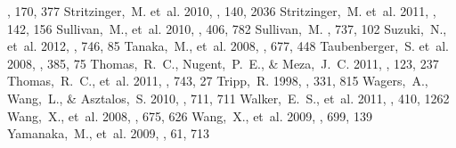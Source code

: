 \documentclass[apj]{emulateapj-rtx4}
\begin{document}
\begin{thebibliography}{}
  \apjs, 170, 377 
  Stritzinger,~M. et~al. 2010, \aj, 140, 2036
  Stritzinger,~M. et~al. 2011, \aj, 142, 156
 Sullivan,~M., et~al. 2010,
  \mnras, 406, 782 
 Sullivan,~M. \apj, 737,
  102
 Suzuki,~N., et~al. 2012, \apj,
  746, 85
 Tanaka,~M., et~al. 2008, \apj,
  677, 448 
  Taubenberger,~S. et~al. 2008, \mnras, 385, 75
 Thomas,~R.~C.,
  Nugent,~P.~E., \& Meza,~J.~C. 2011, \pasp, 123, 237
 Thomas,~R.~C., et~al. 2011,
  \apj, 743, 27
 Tripp,~R. 1998, \aap, 331, 815
 Wagers,~A., Wang,~L., \&
  Asztalos,~S. 2010, \apj, 711, 711
 Walker,~E.~S., et~al. 2011,
  \mnras, 410, 1262
 Wang,~X., et~al. 2008, \apj, 675,
  626
 Wang,~X., et~al. 2009, \apjl, 699,
  139
 Yamanaka,~M., et~al. 2009,
  \pasj, 61, 713
\end{thebibliography}

\clearpage
\LongTables

\clearpage
\begin{landscape}
\clearpage
\end{landscape}

\clearpage

\clearpage

\clearpage
\begin{landscape}
\clearpage
\end{landscape}
\end{document}
